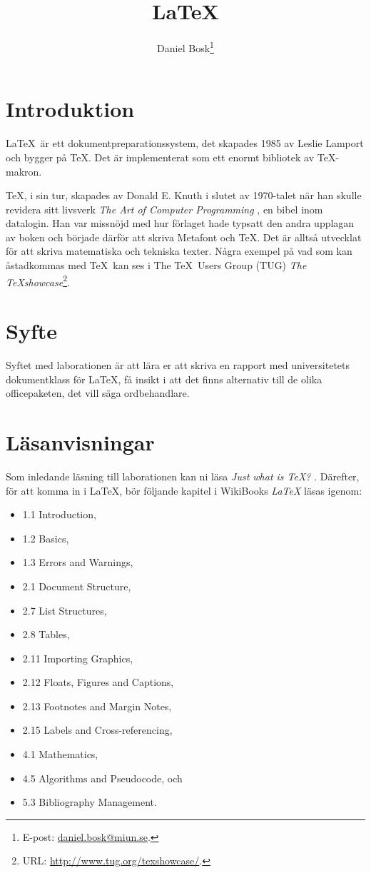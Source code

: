 \documentclass[11pt,a4paper]{miunasgn}
\title{\LaTeX}
\author{Daniel Bosk\footnote{%
	E-post: \href{mailto:daniel.bosk@miun.se}{daniel.bosk@miun.se}.
}}
\date{\svnId}
\begin{document}
\maketitle
\thispagestyle{foot}
\tableofcontents


\section{Introduktion}
\label{sec:Introduktion}
\noindent
\LaTeX\ är ett dokumentpreparationssystem, det skapades 1985 av Leslie Lamport 
och bygger på \TeX.
Det är implementerat som ett enormt bibliotek av \TeX-makron.

\TeX, i sin tur, skapades av Donald E. Knuth i slutet av 1970-talet när han 
skulle revidera sitt livsverk \emph{The Art of Computer Programming} 
\citep{TUG2011jwi}, en bibel inom datalogin.
Han var missnöjd med hur förlaget hade typsatt den andra upplagan av boken och 
började därför att skriva Metafont och \TeX.
Det är alltså utvecklat för att skriva matematiska och tekniska texter.
Några exempel på vad som kan åstadkommas med \TeX\ kan ses i The \TeX\ Users 
Group (TUG) \emph{The \TeX showcase}\footnote{%
	URL: \url{http://www.tug.org/texshowcase/}.
}.


\section{Syfte}
\label{sec:Syfte}
\noindent
Syftet med laborationen är att lära er att skriva en rapport med universitetets 
dokumentklass för \LaTeX, få insikt i att det finns alternativ till de olika 
officepaketen, det vill säga ordbehandlare.


\section{Läsanvisningar}
\label{sec:Lasanvisningar}
\noindent
Som inledande läsning till laborationen kan ni läsa \emph{Just what is \TeX?} 
\citep{TUG2011jwi}.
Därefter, för att komma in i \LaTeX, bör följande kapitel i WikiBooks 
\emph{\LaTeX} \citep{Wikibooks2012l} läsas igenom:
\begin{itemize}
	\item 1.1 Introduction,
	\item 1.2 Basics,
	\item 1.3 Errors and Warnings,
	\item 2.1 Document Structure,
	\item 2.7 List Structures,
	\item 2.8 Tables,
	\item 2.11 Importing Graphics,
	\item 2.12 Floats, Figures and Captions,
	\item 2.13 Footnotes and Margin Notes,
	\item 2.15 Labels and Cross-referencing,
	\item 4.1 Mathematics,
	\item 4.5 Algorithms and Pseudocode, och
	\item 5.3 Bibliography Management.
\end{itemize}
\end{document}
